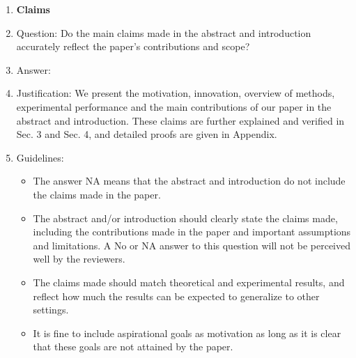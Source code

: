 \documentclass{article}
\begin{document}
\begin{enumerate}

\item {\bf Claims}
    \item[] Question: Do the main claims made in the abstract and introduction accurately reflect the paper's contributions and scope?
    \item[] Answer: \answerYes{} %
    \item[] Justification: We present the motivation, innovation, overview of methods, experimental performance and the main contributions of our paper in the abstract and introduction. These claims are further explained and verified in Sec. 3 and Sec. 4, and detailed proofs are given in Appendix.
    \item[] Guidelines:
    \begin{itemize}
        \item The answer NA means that the abstract and introduction do not include the claims made in the paper.
        \item The abstract and/or introduction should clearly state the claims made, including the contributions made in the paper and important assumptions and limitations. A No or NA answer to this question will not be perceived well by the reviewers. 
        \item The claims made should match theoretical and experimental results, and reflect how much the results can be expected to generalize to other settings. 
        \item It is fine to include aspirational goals as motivation as long as it is clear that these goals are not attained by the paper. 
    \end{itemize}


\end{enumerate}
\end{document}
